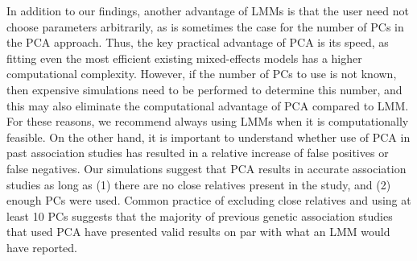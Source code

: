 \documentclass[11pt]{article}
\begin{document}
In addition to our findings, another advantage of LMMs is that the user need not choose parameters arbitrarily, as is sometimes the case for the number of PCs in the PCA approach.
Thus, the key practical advantage of PCA is its speed, as fitting even the most efficient existing mixed-effects models has a higher computational complexity.
However, if the number of PCs to use is not known, then expensive simulations need to be performed to determine this number, and this may also eliminate the computational advantage of PCA compared to LMM.
For these reasons, we recommend always using LMMs when it is computationally feasible.
On the other hand, it is important to understand whether use of PCA in past association studies has resulted in a relative increase of false positives or false negatives.
Our simulations suggest that PCA results in accurate association studies as long as
(1) there are no close relatives present in the study, and
(2) enough PCs were used.
Common practice of excluding close relatives and using at least 10 PCs suggests that the majority of previous genetic association studies that used PCA have presented valid results on par with what an LMM would have reported.

\printbibliography
\end{document}
